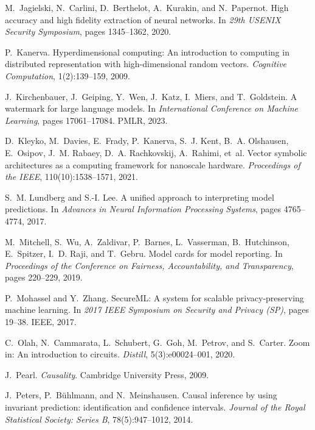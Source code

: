 \documentclass[11pt,a4paper]{article}
\begin{document}
\begin{thebibliography}{10}
M.~Jagielski, N.~Carlini, D.~Berthelot, A.~Kurakin, and N.~Papernot.
\newblock High accuracy and high fidelity extraction of neural networks.
\newblock In \textit{29th USENIX Security Symposium}, pages 1345--1362, 2020.

P.~Kanerva.
\newblock Hyperdimensional computing: An introduction to computing in distributed representation with high-dimensional random vectors.
\newblock \textit{Cognitive Computation}, 1(2):139--159, 2009.

J.~Kirchenbauer, J.~Geiping, Y.~Wen, J.~Katz, I.~Miers, and T.~Goldstein.
\newblock A watermark for large language models.
\newblock In \textit{International Conference on Machine Learning}, pages 17061--17084. PMLR, 2023.

D.~Kleyko, M.~Davies, E.~Frady, P.~Kanerva, S.~J. Kent, B.~A. Olshausen, E.~Osipov, J.~M. Rabaey, D.~A. Rachkovskij, A.~Rahimi, et~al.
\newblock Vector symbolic architectures as a computing framework for nanoscale hardware.
\newblock \textit{Proceedings of the IEEE}, 110(10):1538--1571, 2021.

S.~M. Lundberg and S.-I. Lee.
\newblock A unified approach to interpreting model predictions.
\newblock In \textit{Advances in Neural Information Processing Systems}, pages 4765--4774, 2017.

M.~Mitchell, S.~Wu, A.~Zaldivar, P.~Barnes, L.~Vasserman, B.~Hutchinson, E.~Spitzer, I.~D. Raji, and T.~Gebru.
\newblock Model cards for model reporting.
\newblock In \textit{Proceedings of the Conference on Fairness, Accountability, and Transparency}, pages 220--229, 2019.

P.~Mohassel and Y.~Zhang.
\newblock SecureML: A system for scalable privacy-preserving machine learning.
\newblock In \textit{2017 IEEE Symposium on Security and Privacy (SP)}, pages 19--38. IEEE, 2017.

C.~Olah, N.~Cammarata, L.~Schubert, G.~Goh, M.~Petrov, and S.~Carter.
\newblock Zoom in: An introduction to circuits.
\newblock \textit{Distill}, 5(3):e00024--001, 2020.

J.~Pearl.
\newblock \textit{Causality}.
\newblock Cambridge University Press, 2009.

J.~Peters, P.~Bühlmann, and N.~Meinshausen.
\newblock Causal inference by using invariant prediction: identification and confidence intervals.
\newblock \textit{Journal of the Royal Statistical Society: Series B}, 78(5):947--1012, 2014.


\end{thebibliography}
\end{document}
